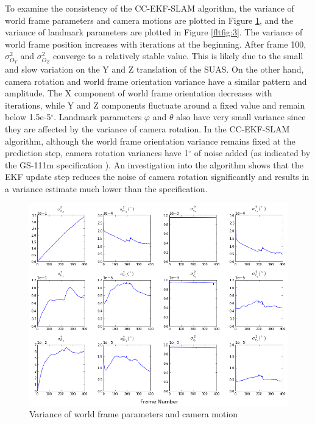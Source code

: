 To examine the consistency of the CC-EKF-SLAM algorithm, the variance
of world frame parameters and camera motions are plotted in Figure
\ref{fltfig:120}, and the variance of landmark parameters are plotted
in Figure \ref{fltfig:3}. The variance of world frame position
increases with iterations at the beginning. After frame 100,
$\sigma^2_{O_Y}$ and $\sigma^2_{O_Z}$ converge to a relatively stable
value. This is likely due to the small and slow variation on the Y and
Z translation of the SUAS. On the other hand, camera rotation and
world frame orientation variance have a similar pattern and amplitude.
The X component of world frame orientation decreases with iterations,
while Y and Z components fluctuate around a fixed value and remain
below 1.5e-5$^\circ$. Landmark parameters $\varphi$ and $\theta$ also
have very small variance since they are affected by the variance of
camera rotation. In the CC-EKF-SLAM algorithm, although the world
frame orientation variance remains fixed at the prediction step,
camera rotation variances have 1$^\circ$ of noise added (as indicated
by the GS-111m specification \cite{_athena_????}). An investigation
into the algorithm shows that the EKF update step reduces the noise of
camera rotation significantly and results in a variance estimate much
lower than the specification.


\begin{figure}[h]
\centering
\includegraphics[width=14cm, keepaspectratio=true]
{./Figures/fltfig/cut1/Figure120.png}
\caption{Variance of world frame parameters and camera motion}
\label{fltfig:120}
\end{figure}


